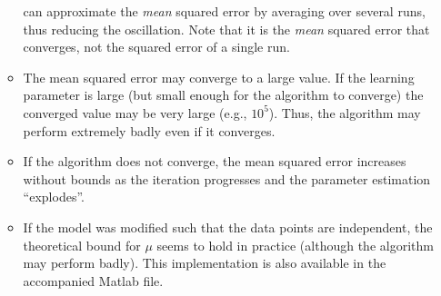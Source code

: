 \begin{enumerate}
\begin{solution}
\begin{itemize}
      can approximate the \emph{mean} squared error by averaging over
      several runs, thus reducing the oscillation.  Note that it is
      the \emph{mean} squared error that converges, not the squared
      error of a single run.
    \item The mean squared error may converge to a large value.  If
      the learning parameter is large (but small enough for the
      algorithm to converge) the converged value may be very large
      (e.g., $10^5$).  Thus, the algorithm may perform extremely badly
      even if it converges.
    \item If the algorithm does not converge, the mean squared error
      increases without bounds as the iteration progresses and the
      parameter estimation ``explodes''.
    \item If the model was modified such that the data points are
      independent, the theoretical bound for $\mu$ seems to hold in
      practice (although the algorithm may perform badly).  This
      implementation is also available in the accompanied Matlab file.
    \end{itemize}
    
    
  \end{solution}
  

    


\end{enumerate}
